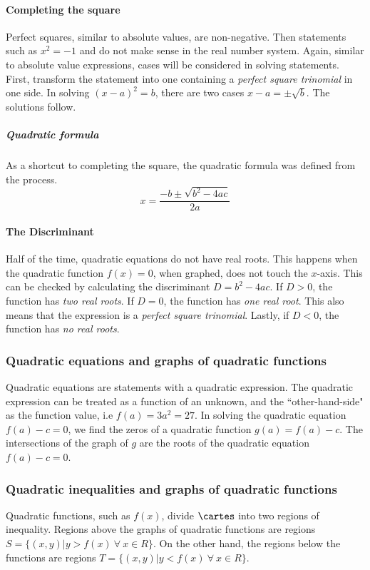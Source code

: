 \paragraph{Completing the square}
Perfect squares, similar to absolute values, are non-negative.
Then statements such as $x^2 = -1$ and do not make sense in the real number system.
Again, similar to absolute value expressions, cases will be considered in solving statements.
First, transform the statement into one containing a \emph{perfect square trinomial} in one side.
In solving $(x-a)^2 = b$, there are two cases $x-a = \pm \sqrt{b}$.
The solutions follow.

\subparagraph{Quadratic formula}
As a shortcut to completing the square, the quadratic formula was defined from the process.
\[
x = \dfrac{-b \pm \sqrt{b^2-4ac}}{2a}
\]

\paragraph{The Discriminant}
Half of the time, quadratic equations do not have real roots.
This happens when the quadratic function $f(x) = 0$, when graphed, does not touch the $x$-axis.
This can be checked by calculating the discriminant $D = b^2-4ac$.
If $D > 0$, the function has \emph{two real roots}.
If $D = 0$, the function has \emph{one real root}.
This also means that the expression is a \emph{perfect square trinomial}.
Lastly, if $D < 0$, the function has \emph{no real roots}.

\subsubsection{Quadratic equations and graphs of quadratic functions}
Quadratic equations are statements with a quadratic expression.
The quadratic expression can be treated as a function of an unknown, and the ``other-hand-side" as the function value, i.e $f(a) = 3a^2 = 27$.
In solving the quadratic equation $f(a)-c = 0$, we find the zeros of a quadratic function $g(a) = f(a)-c$.
The intersections of the graph of $g$ are the roots of the quadratic equation $f(a)-c = 0$.

\subsubsection{Quadratic inequalities and graphs of quadratic functions}
Quadratic functions, such as $f(x)$, divide $\cartes$ into two regions of inequality.
Regions above the graphs of quadratic functions are regions $S = \{(x, y) | y > f(x)\ \forall\ x \in R\}$.
On the other hand, the regions below the functions are regions $T = \{(x, y) | y < f(x)\ \forall\ x \in R\}$.

